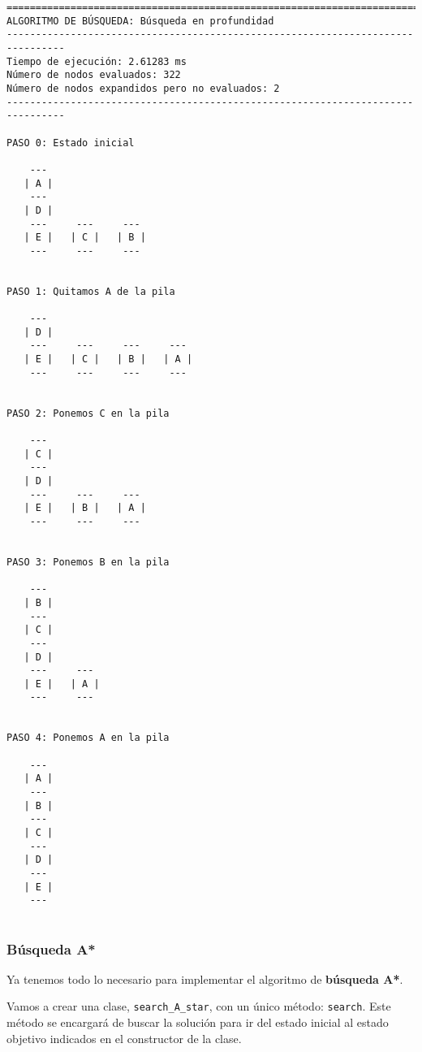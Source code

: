 \documentclass[11pt]{article}
\begin{document}
    \begin{Verbatim}[commandchars=\\\{\}]
================================================================================
ALGORITMO DE BÚSQUEDA: Búsqueda en profundidad
--------------------------------------------------------------------------------
Tiempo de ejecución: 2.61283 ms
Número de nodos evaluados: 322
Número de nodos expandidos pero no evaluados: 2
--------------------------------------------------------------------------------

PASO 0: Estado inicial

    --- 
   | A |
    --- 
   | D |
    ---     ---     --- 
   | E |   | C |   | B |
    ---     ---     --- 


PASO 1: Quitamos A de la pila

    --- 
   | D |
    ---     ---     ---     --- 
   | E |   | C |   | B |   | A |
    ---     ---     ---     --- 


PASO 2: Ponemos C en la pila

    --- 
   | C |
    --- 
   | D |
    ---     ---     --- 
   | E |   | B |   | A |
    ---     ---     --- 


PASO 3: Ponemos B en la pila

    --- 
   | B |
    --- 
   | C |
    --- 
   | D |
    ---     --- 
   | E |   | A |
    ---     --- 


PASO 4: Ponemos A en la pila

    --- 
   | A |
    --- 
   | B |
    --- 
   | C |
    --- 
   | D |
    --- 
   | E |
    --- 


    \end{Verbatim}

    \hypertarget{buxfasqueda-a}{%
\subsubsection{Búsqueda A*}\label{buxfasqueda-a}}

Ya tenemos todo lo necesario para implementar el algoritmo de
\textbf{búsqueda A*}.

Vamos a crear una clase, \texttt{search\_A\_star}, con un único método:
\texttt{search}. Este método se encargará de buscar la solución para ir
del estado inicial al estado objetivo indicados en el constructor de la
clase.
\end{document}

